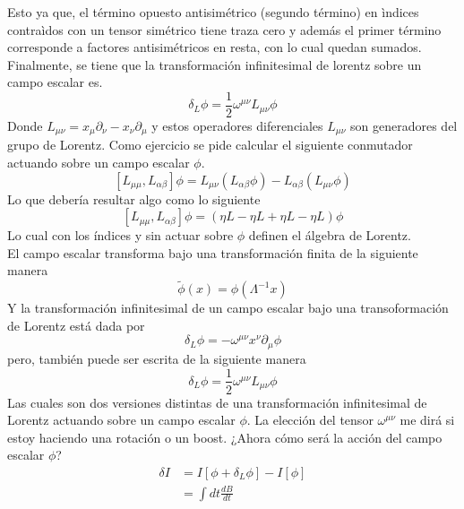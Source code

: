 \documentclass[../main.tex]{subfiles}
\begin{document}
Esto ya que, el término opuesto antisimétrico (segundo término) en ìndices contraìdos con un tensor simétrico tiene traza cero y además el primer término corresponde a factores antisimétricos en resta, con lo cual quedan sumados. Finalmente, se tiene que la transformación infinitesimal de lorentz sobre un campo escalar es.
\begin{equation*}
  \delta_L \phi = \frac{1}{2}\omega^{\mu \nu} L_{\mu \nu}\phi
\end{equation*}
Donde $L_{\mu \nu} = x_\mu\partial_\nu - x_\nu \partial_\mu$ y estos operadores diferenciales $L_{\mu \nu}$ son generadores del grupo de Lorentz. Como ejercicio se pide calcular el siguiente conmutador actuando sobre un campo escalar $\phi$.
\begin{equation}
  \left[ L_{\mu \mu}, L_{\alpha \beta} \right] \phi = L_{\mu \nu} \left( L_{\alpha \beta}\phi\right) - L_{\alpha \beta} \left( L_{\mu \nu}\phi \right)
\end{equation}
Lo que debería resultar algo como lo siguiente
\begin{equation}
  \left[ L_{\mu \mu}, L_{\alpha \beta} \right] \phi = (\eta L - \eta L + \eta L - \eta L  ) \phi
\end{equation}
Lo cual con los índices y sin actuar sobre $\phi$ definen el álgebra de Lorentz. \\
El campo escalar transforma bajo una transformación finita de la siguiente manera
\begin{equation*}
  \tilde{\phi}(x) = \phi(\Lambda^{-1}x)
\end{equation*}
Y la transformación infinitesimal de un campo escalar bajo una transoformación de Lorentz está dada por
\begin{equation*}
  \delta_L\phi = -\omega^{\mu \nu} x^\nu \partial_\mu \phi
\end{equation*}
pero, también puede ser escrita de la siguiente manera
\begin{equation*}
  \delta_L\phi = \frac{1}{2} \omega^{\mu \nu} L_{\mu \nu}\phi
\end{equation*}
Las cuales son dos versiones distintas de una transformación infinitesimal de Lorentz actuando sobre un campo escalar $\phi$. La elección del tensor $\omega^{\mu \nu}$ me dirá si estoy haciendo una rotación o un boost. ¿Ahora cómo será la acción del campo escalar $\phi$?
\begin{align*}
  \delta I & = I \left[ \phi + \delta_L \phi \right] - I[\phi] \\
  & = \int dt \frac{dB}{dt}
\end{align*}
\end{document}
